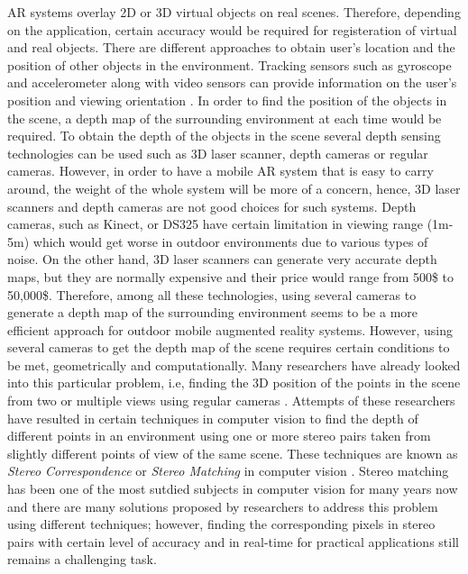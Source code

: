 \documentclass[dvips,letterpaper,12pt]{report}
\begin{document}
AR systems overlay 2D or 3D virtual objects on real scenes. Therefore, depending on the application, certain accuracy would be required for 
registeration of virtual and real objects. There are different approaches to obtain user's location and the position of other objects in the environment.
Tracking sensors such as gyroscope and accelerometer along with video sensors can provide information on the user's position and viewing orientation \cite{azum01}.
In order to find the position of the objects in the scene, a depth map of the surrounding environment at each time would be required. To obtain the depth of the 
objects in the scene several depth sensing technologies can be used such as 3D laser scanner, depth cameras or regular cameras. However, in order to have a mobile AR
system that is easy to carry around, the weight of the whole system will be more of a concern, hence, 3D laser scanners and depth cameras are not good choices for such systems.
Depth cameras, such as Kinect, or DS325 have certain limitation in viewing range (1m-5m) which would get worse in outdoor environments due to various types of noise. 
On the other hand, 3D laser scanners can
generate very accurate depth maps, but they are normally expensive and their price would range from 500\$ to 50,000\$. Therefore, among all these technologies, using several 
cameras to generate a depth map of the surrounding environment seems to be a more efficient approach for outdoor mobile augmented reality systems. {\newline}
However, using several cameras to get the depth map of the scene requires certain conditions to be met, geometrically and computationally. Many researchers have already looked into
this particular problem, i.e, finding the 3D position of the points in the scene from two or multiple views using regular cameras \cite{sze11}. Attempts of these researchers have resulted in
certain techniques in computer vision to find the depth of different points in an environment using one or more stereo pairs taken from slightly different points of view of the same scene.
These techniques are known as {\it Stereo Correspondence} or {\it Stereo Matching} in computer vision \cite{sze11}. Stereo matching has been one of the most sutdied subjects in computer vision for 
many years now and there are many solutions proposed by researchers to address this problem using different techniques; however, finding the corresponding pixels in stereo pairs with certain level of 
accuracy and in real-time for practical applications still remains a challenging task. {\newline}
\end{document}
